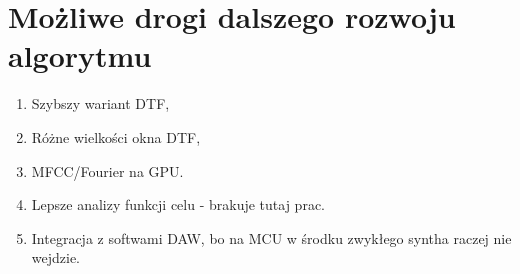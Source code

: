 \section{Możliwe drogi dalszego rozwoju algorytmu}

\begin{enumerate}
  \item Szybszy wariant DTF,
  \item Różne wielkości okna DTF,
  \item MFCC/Fourier na GPU\@.
  \item Lepsze analizy funkcji celu - brakuje tutaj prac.
  \item Integracja z softwami DAW\@, bo na MCU w środku zwykłego syntha raczej nie wejdzie.
\end{enumerate}


